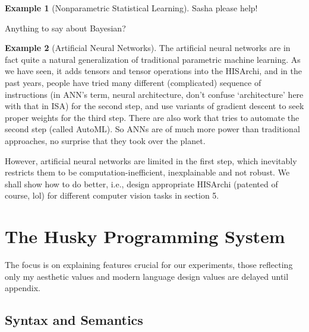 \documentclass[10pt, oneside]{article}   	%
\theoremstyle{definition}
\newtheorem*{eg}{Example}
\begin{document}
\begin{eg}
	[Nonparametric Statistical Learning]

	Sasha please help!
\end{eg}
Anything to say about Bayesian?
\begin{eg}[Artificial Neural Networks]
	The artificial neural networks are in fact quite a natural generalization of traditional parametric machine learning. As we have seen, it adds tensors and tensor operations into the HISArchi, and in the past years, people have tried many different (complicated) sequence of instructions (in ANN's term, neural architecture, don't confuse `architecture' here with that in ISA) for the second step, and use variants of gradient descent to seek proper weights for the third step. There are also work that tries to automate the second step (called AutoML). So ANNs are of much more power than traditional approaches, no surprise that they took over the planet.

	However, artificial neural networks are limited in the first step, which inevitably restricts them to be computation-inefficient, inexplainable and not robust. We shall show how to do better, i.e., design appropriate HISArchi (patented of course, lol) for different computer vision tasks in section 5.
\end{eg}





































\section{The Husky Programming System}
The focus is on explaining features crucial for our experiments, those reflecting only my aesthetic values and modern language design values are delayed until appendix.
\subsection{Syntax and Semantics}
\end{document}
